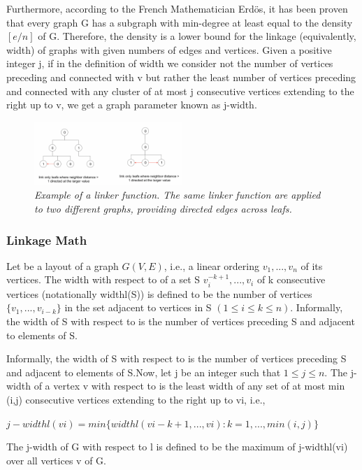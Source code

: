 Furthermore, according to the French Mathematician Erdös, it has been proven that every graph G has a subgraph with min-degree at least equal to the density $[e/n]$ of G. Therefore, the density is a lower bound for the linkage (equivalently, width) of graphs with given numbers of edges and vertices. Given a positive integer j, if in the definition of width we consider not the number of vertices preceding and connected with v but rather the least number of vertices preceding and connected with any cluster of at most j consecutive vertices extending to the right up to v, we get a graph parameter known as j-width.

\begin{figure}
	\centering
        \includegraphics[width=0.5\textwidth]{images/linkage.png}
	\caption{\textit{Example of a linker function. The same linker function are applied to two different graphs, providing directed edges across leafs.}}
	\label{fig:linkage}
\end{figure}

\subsubsection{Linkage Math}

Let be a layout of a graph $G (V, E)$, i.e., a linear ordering $v_{1} ,..., v_{n}$ of its vertices. The width with respect to of a set S ${v_{i}^{-k+1},...,v_{i}}$ of k consecutive vertices (notationally widthl(S)) is defined to be the number of vertices $\lbrace v_1,...,v_{i-k} \rbrace$ in the set adjacent to vertices in S $(1 \le i \le k \le n)$. Informally, the width of S with respect to is the number of vertices preceding S and adjacent to elements of S.

Informally, the width of S with respect to is the number of vertices preceding S and adjacent to elements of S.Now, let j be an integer such that $1 \le j \le n$. The j-width of a vertex v with respect to is the least width of any set of at most min (i,j) consecutive vertices extending to the right up to vi, i.e.,

$j-widthl(vi) = min \lbrace widthl(vi-k+1,...,vi):k =1,..., min(i,j)\rbrace$

The j-width of G with respect to l is defined to be the maximum of j-widthl(vi) over all vertices v of G.

